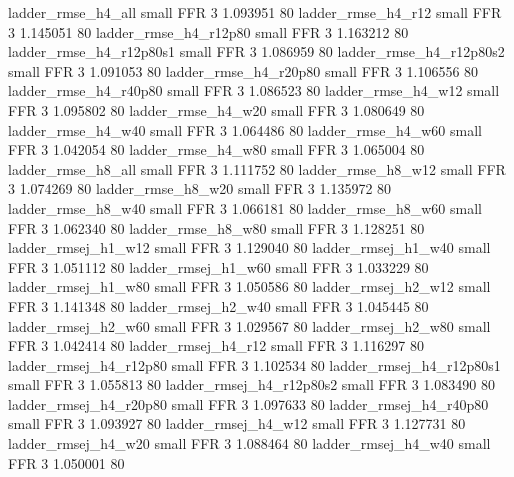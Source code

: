       ladder_rmse_h4_all      small      FFR                 3 1.093951 80
      ladder_rmse_h4_r12      small      FFR                 3 1.145051 80
   ladder_rmse_h4_r12p80      small      FFR                 3 1.163212 80
 ladder_rmse_h4_r12p80s1      small      FFR                 3 1.086959 80
 ladder_rmse_h4_r12p80s2      small      FFR                 3 1.091053 80
   ladder_rmse_h4_r20p80      small      FFR                 3 1.106556 80
   ladder_rmse_h4_r40p80      small      FFR                 3 1.086523 80
      ladder_rmse_h4_w12      small      FFR                 3 1.095802 80
      ladder_rmse_h4_w20      small      FFR                 3 1.080649 80
      ladder_rmse_h4_w40      small      FFR                 3 1.064486 80
      ladder_rmse_h4_w60      small      FFR                 3 1.042054 80
      ladder_rmse_h4_w80      small      FFR                 3 1.065004 80
      ladder_rmse_h8_all      small      FFR                 3 1.111752 80
      ladder_rmse_h8_w12      small      FFR                 3 1.074269 80
      ladder_rmse_h8_w20      small      FFR                 3 1.135972 80
      ladder_rmse_h8_w40      small      FFR                 3 1.066181 80
      ladder_rmse_h8_w60      small      FFR                 3 1.062340 80
      ladder_rmse_h8_w80      small      FFR                 3 1.128251 80
     ladder_rmsej_h1_w12      small      FFR                 3 1.129040 80
     ladder_rmsej_h1_w40      small      FFR                 3 1.051112 80
     ladder_rmsej_h1_w60      small      FFR                 3 1.033229 80
     ladder_rmsej_h1_w80      small      FFR                 3 1.050586 80
     ladder_rmsej_h2_w12      small      FFR                 3 1.141348 80
     ladder_rmsej_h2_w40      small      FFR                 3 1.045445 80
     ladder_rmsej_h2_w60      small      FFR                 3 1.029567 80
     ladder_rmsej_h2_w80      small      FFR                 3 1.042414 80
     ladder_rmsej_h4_r12      small      FFR                 3 1.116297 80
  ladder_rmsej_h4_r12p80      small      FFR                 3 1.102534 80
ladder_rmsej_h4_r12p80s1      small      FFR                 3 1.055813 80
ladder_rmsej_h4_r12p80s2      small      FFR                 3 1.083490 80
  ladder_rmsej_h4_r20p80      small      FFR                 3 1.097633 80
  ladder_rmsej_h4_r40p80      small      FFR                 3 1.093927 80
     ladder_rmsej_h4_w12      small      FFR                 3 1.127731 80
     ladder_rmsej_h4_w20      small      FFR                 3 1.088464 80
     ladder_rmsej_h4_w40      small      FFR                 3 1.050001 80
